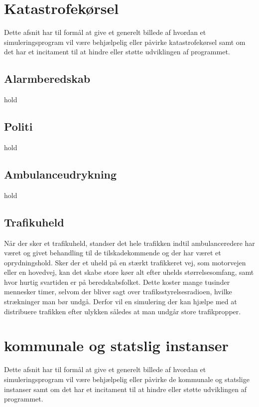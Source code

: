 \section{Katastrofekørsel}

Dette afsnit har til formål at give et generelt billede af hvordan et simuleringsprogram vil være behjælpelig eller påvirke katastrofekørsel samt om det har et incitament til at hindre eller støtte udviklingen af programmet.

\subsection{Alarmberedskab}

hold

\subsection{Politi}

hold

\subsection{Ambulanceudrykning}

hold

\subsection{Trafikuheld}

Når der sker et trafikuheld, standser det hele trafikken indtil ambulanceredere har været og givet behandling til de tilskadekommende og der har været et oprydningshold. Sker der et uheld på en stærkt trafikkeret vej, som motorvejen eller en hovedvej, kan det skabe store køer alt efter uhelds størrelsesomfang, samt hvor hurtig svartiden er på beredskabsfolket. Dette koster mange tusinder mennesker timer, selvom der bliver sagt over trafiksstyrelsesradioen, hvilke strækninger man bør undgå. Derfor vil en simulering der kan hjælpe med at distribuere trafikken efter ulykken således at man undgår store trafikpropper.

\section{kommunale og statslig instanser}

Dette afsnit har til formål at give et generelt billede af hvordan et simuleringsprogram vil være behjælpelig eller påvirke de kommunale og statslige instanser samt om det har et incitament til at hindre eller støtte udviklingen af programmet.

